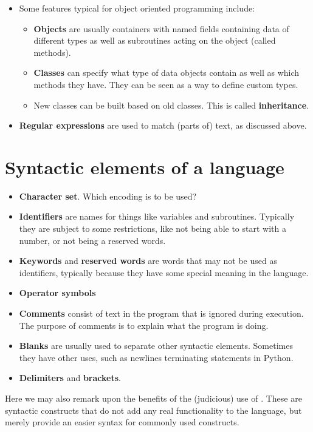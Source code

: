 \begin{itemize}
\begin{itemize}
\end{itemize}
\item Some features typical for object oriented programming include:
\begin{itemize}
\item \textbf{Objects} are usually containers with named fields containing data of different types as well as subroutines acting on the object (called methods).
\item \textbf{Classes} can specify what type of data objects contain as well as which methods they have. They can be seen as a way to define custom types.
\item New classes can be built based on old classes. This is called \textbf{inheritance}.
\end{itemize}
\item \textbf{Regular expressions} are used to match (parts of) text, as discussed above.
\end{itemize}

\section{Syntactic elements of a language}
\begin{itemize}
\item \textbf{Character set}. Which encoding is to be used?
\item \textbf{Identifiers} are names for things like variables and subroutines. Typically they are subject to some restrictions, like not being able to start with a number, or not being a reserved words.
\item \textbf{Keywords} and \textbf{reserved words} are words that may not be used as identifiers, typically because they have some special meaning in the language.
\item \textbf{Operator symbols}
\item \textbf{Comments} consist of text in the program that is ignored during execution. The purpose of comments is to explain what the program is doing.
\item \textbf{Blanks} are usually used to separate other syntactic elements. Sometimes they have other uses, such as newlines terminating statements in Python.
\item \textbf{Delimiters} and \textbf{brackets}.
\end{itemize}
Here we may also remark upon the benefits of the (judicious) use of . These are syntactic constructs that do not add any real functionality to the language, but merely provide an easier syntax for commonly used constructs.


